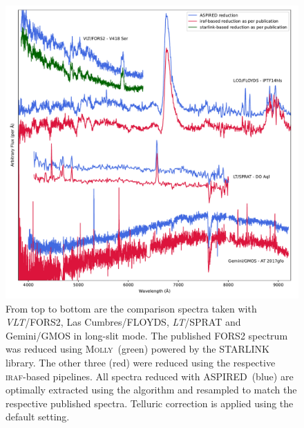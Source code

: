 \documentclass[linenumbers, twocolumn]{aastex631}
\begin{document}
\begin{figure}
    \centering
    \includegraphics[width=\textwidth]{fig_09_reduction_compared.pdf}
    \caption{From top to bottom are the comparison spectra taken with \textit{VLT}/FORS2,
    Las Cumbres/FLOYDS, \textit{LT}/SPRAT and Gemini/GMOS in long-slit mode. The published FORS2
    spectrum was reduced using \textsc{Molly}~(green) powered by the \textsc{STARLINK}
    library. The other three (red) were reduced using the respective \textsc{iraf}-based
    pipelines. All spectra reduced with \textsc{ASPIRED}~(blue) are optimally extracted using the \cite{1986PASP...98..609H} algorithm and resampled to match
    the respective published spectra. Telluric correction is applied using the default
    setting.}
    \label{fig:reduction_compared}
\end{figure}
\end{document}
